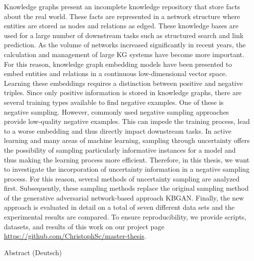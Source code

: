 %
\label{sec:abstract}
%
Knowledge graphs present an incomplete knowledge repository that store facts about the real world.
These facts are represented in a network structure where entities are stored as nodes and relations as edged.
These knowledge bases are used for a large number of downstream tasks such as structured search and link prediction.
As the volume of networks increased significantly in recent years, the calculation and management of large KG systems have become more important.
For this reason, knowledge graph embedding models have been presented to embed entities and relations in a continuous low-dimensional vector space.
Learning these embeddings requires a distinction between positive and negative triples.
Since only positive information is stored in knowledge graphs, there are several training types available to find negative examples.
One of these is negative sampling. 
However, commonly used negative sampling approaches provide low-quality negative examples.
This can impede the training process, lead to a worse embedding and thus directly impact downstream tasks.
In active learning and many areas of machine learning, sampling through uncertainty offers the possibility of sampling particularly informative instances for a model and thus making the learning process more efficient.
Therefore, in this thesis, we want to investigate the incorporation of uncertainty information in a negative sampling process.
For this reason, several methods of uncertainty sampling are analyzed first.
Subsequently, these sampling methods replace the original sampling method of the generative adversarial network-based approach KBGAN. 
Finally, the new approach is evaluated in detail on a total of seven different data sets and the experimental results are compared.
To ensure reproducibility, we provide scripts, datasets, and results of this work on our project page \url{https://github.com/ChristophSc/master-thesis}.

\clearpage
{Abstract (Deutsch)}
\label{sec:abstract-german}\\

